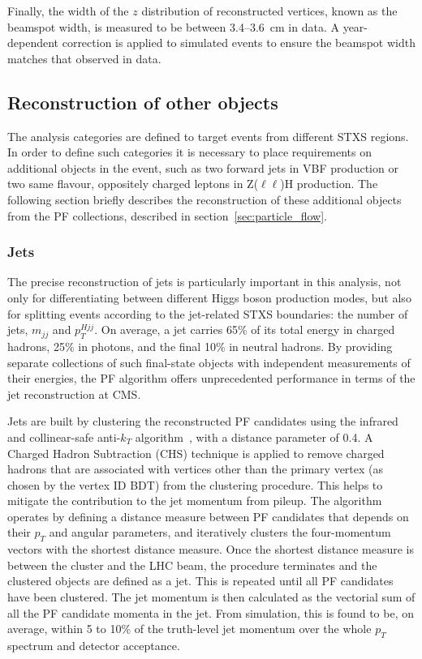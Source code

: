 Finally, the width of the $z$ distribution of reconstructed vertices, known as the beamspot width, is measured to be between 3.4--3.6~cm in data. A year-dependent correction is applied to simulated events to ensure the beamspot width matches that observed in data.

\subsection{Reconstruction of other objects}\label{sec:hgg_otherobjects}
The analysis categories are defined to target events from different STXS regions. In order to define such categories it is necessary to place requirements on additional objects in the event, such as two forward jets in VBF production or two same flavour, oppositely charged leptons in Z($\ell\ell$)H production. The following section briefly describes the reconstruction of these additional objects from the PF collections, described in section~\ref{sec:particle_flow}.

\subsubsection{Jets}
The precise reconstruction of jets is particularly important in this analysis, not only for differentiating between different Higgs boson production modes, but also for splitting events according to the jet-related STXS boundaries: the number of jets, $m_{jj}$ and $p_T^{Hjj}$. On average, a jet carries 65\% of its total energy in charged hadrons, 25\% in photons, and the final 10\% in neutral hadrons. By providing separate collections of such final-state objects with independent measurements of their energies, the PF algorithm offers unprecedented performance in terms of the jet reconstruction at CMS. 

Jets are built by clustering the reconstructed PF candidates using the infrared and collinear-safe anti-$k_T$ algorithm~\cite{Cacciari:2008gp,Cacciari:2011ma}, with a distance parameter of 0.4. A Charged Hadron Subtraction (CHS) technique is applied to remove charged hadrons that are associated with vertices other than the primary vertex (as chosen by the vertex ID BDT) from the clustering procedure. This helps to mitigate the contribution to the jet momentum from pileup. The algorithm operates by defining a distance measure between PF candidates that depends on their $p_T$ and angular parameters, and iteratively clusters the four-momentum vectors with the shortest distance measure. Once the shortest distance measure is between the cluster and the LHC beam, the procedure terminates and the clustered objects are defined as a jet. This is repeated until all PF candidates have been clustered. The jet momentum is then calculated as the vectorial sum of all the PF candidate momenta in the jet. From simulation, this is found to be, on average, within 5 to 10\% of the truth-level jet momentum over the whole $p_T$ spectrum and detector acceptance.

